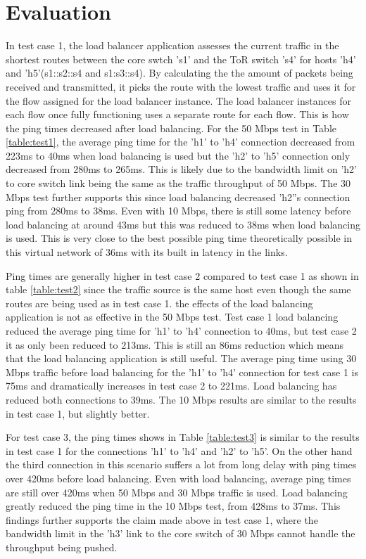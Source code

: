 \clearpage
\section{Evaluation}
In test case 1, the load balancer application assesses the current traffic in the shortest routes between the core swtch 's1' and the ToR switch 's4' for hosts 'h4' and 'h5'(s1::s2::s4 and s1:s3::s4). By calculating the the amount of packets being received and transmitted, it picks the route with the lowest traffic and uses it for the flow assigned for the load balancer instance. The load balancer instances for each flow once fully functioning uses a separate route for each flow. This is how the ping times decreased after load balancing. For the 50 Mbps test in Table \ref{table:test1}, the average ping time for the 'h1' to 'h4' connection decreased from 223ms to 40ms when load balancing is used but the 'h2' to 'h5' connection only decreased from 280ms to 265ms. This is likely due to the bandwidth limit on 'h2' to core switch link being the same as the traffic throughput of 50 Mbps. The 30 Mbps test further supports this since load balancing decreased 'h2''s connection ping from 280ms to 38ms. Even with 10 Mbps, there is still some latency before load balancing at around 43ms but this was reduced to 38ms when load balancing is used. This is very close to the best possible ping time theoretically possible in this virtual network of 36ms with its built in latency in the links.
\newline
\par
Ping times are generally higher in test case 2 compared to test case 1 as shown in table \ref{table:test2} since the traffic source is the same host even though the same routes are being used as in test case 1. the effects of the load balancing application is not as effective in the 50 Mbps test. Test case 1 load balancing reduced the average ping time for 'h1' to 'h4' connection to 40ms, but test case 2 it as only been reduced to 213ms. This is still an 86ms reduction which means that the load balancing application is still useful. The average ping time using 30 Mbps traffic before load balancing for the 'h1' to 'h4' connection for test case 1 is 75ms and dramatically increases in test case 2 to 221ms. Load balancing has reduced both connections to 39ms. The 10 Mbps results are similar to the results in test case 1, but slightly better.
\newline
\par
For test case 3, the ping times shows in Table \ref{table:test3} is similar to the results in test case 1 for the connections 'h1' to 'h4' and 'h2' to 'h5'. On the other hand the third connection in this scenario suffers a lot from long delay with ping times over 420ms before load balancing. Even with load balancing, average ping times are still over 420ms when 50 Mbps and 30 Mbps traffic is used. Load balancing greatly reduced the ping time in the 10 Mbps test, from 428ms to 37ms. This findings further supports the claim made above in test case 1, where the bandwidth limit in the 'h3' link to the core switch of 30 Mbps cannot handle the throughput being pushed.
